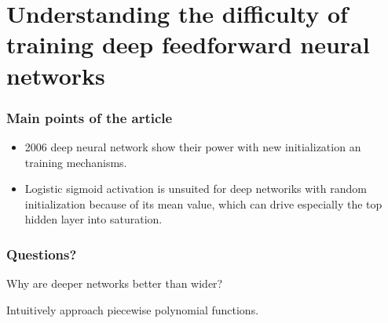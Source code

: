\section*{Understanding the difficulty of training deep feedforward neural networks}

\begin{frame}
    \frametitle{Main points of the article}

    \begin{itemize}
        \item 2006 deep neural network show their power with new initialization an training mechanisms.
        \item Logistic sigmoid activation is unsuited for deep networiks with random initialization because of its mean value, which can drive especially the top hidden layer into saturation. 
    
    \end{itemize}

\end{frame}

\begin{frame}
    \frametitle{Questions?}
    Why are deeper networks better than wider?

    Intuitively approach piecewise polynomial functions.
\end{frame}